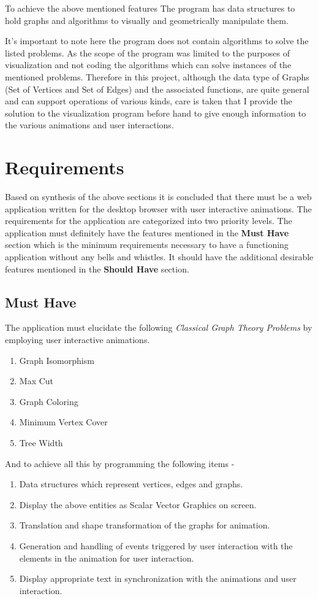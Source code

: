 To achieve the above mentioned features
The program has data structures to hold graphs and
algorithms to visually and geometrically manipulate them. 

It's important to note here the program does not 
contain algorithms to solve the listed problems. As the
scope of the program was limited to the purposes of visualization and not
coding the algorithms which can solve instances of the mentioned problems.
Therefore in this project, although the data type of Graphs (Set of
Vertices and Set of Edges) and the associated functions, are quite general and
can support operations of various kinds, care is taken that I provide the
solution to the visualization program before hand to give enough information to
the various animations and user interactions.


\section{Requirements}
Based on synthesis of the above sections it is concluded that there must be a
web application written for the desktop browser with user interactive
animations. The requirements for the application are categorized into two
priority levels. The application must definitely have the features mentioned
in the \textbf{Must Have} section which is the minimum requirements necessary
to have a functioning application without any bells and whistles. It should
have the additional desirable features mentioned in the \textbf{Should Have}
section. 

\subsection{Must Have}
The application must elucidate the following \emph{Classical Graph Theory
Problems} by employing user interactive animations.
\begin{enumerate}
\item Graph Isomorphism
\item Max Cut
\item Graph Coloring
\item Minimum Vertex Cover
\item Tree Width
\end{enumerate}

And to achieve all this by programming the following items -

\begin{enumerate}
\item Data structures which represent vertices, edges and graphs.
\item Display the above entities as Scalar Vector Graphics on screen.
\item Translation and shape transformation of the graphs for animation.
\item Generation and handling of events triggered by user interaction with the elements in the animation for user interaction.
\item Display appropriate text in synchronization with the animations and user interaction.
\end{enumerate}

